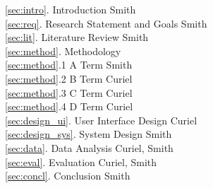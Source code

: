 \ref{sec:intro}. Introduction \dotfill Smith \\
\ref{sec:req}. Research Statement and Goals \dotfill Smith \\
\ref{sec:lit}. Literature Review \dotfill Smith\\
\ref{sec:method}. Methodology\\
\indent \ref{sec:method}.1 A Term \dotfill Smith\\
\indent \ref{sec:method}.2 B Term \dotfill Curiel\\
\indent \ref{sec:method}.3 C Term \dotfill Curiel\\
\indent \ref{sec:method}.4 D Term \dotfill Curiel\\
\ref{sec:design_ui}. User Interface Design \dotfill Curiel\\
\ref{sec:design_sys}. System Design \dotfill Smith\\
\ref{sec:data}. Data Analysis \dotfill Curiel, Smith\\
\ref{sec:eval}. Evaluation \dotfill Curiel, Smith\\
\ref{sec:concl}. Conclusion \dotfill Smith\\